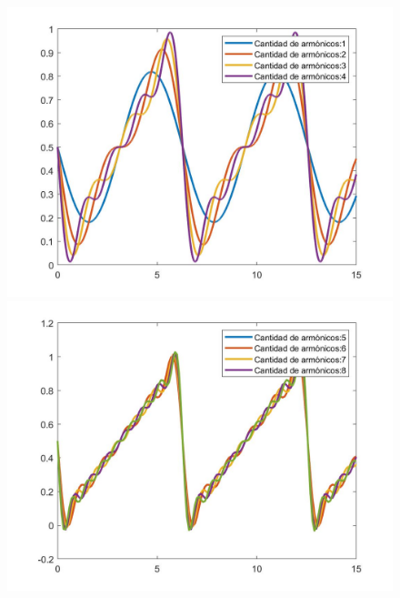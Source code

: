 \documentclass[../../ASSD_TP1_G7.tex]{subfiles}
\begin{document}
\begin{figure}[H]

\begin{centering}
\includegraphics[scale=0.25]{Imagenes/armonicos1a4}\includegraphics[scale=0.25]{Imagenes/armonicos4a8}
\par\end{centering}
\begin{centering}

\end{centering}
\end{figure}
\end{document}
